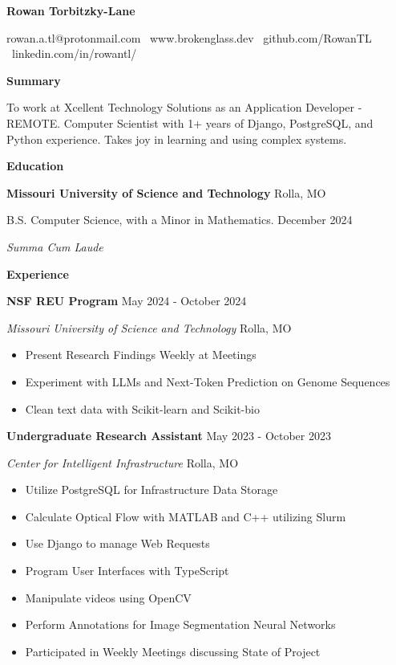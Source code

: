 \documentclass[11pt]{article}
\begin{document}
\begin{center}
    \textbf{\huge Rowan Torbitzky-Lane}\\
    \hrulefill
\end{center}

\begin{center}
    rowan.a.tl@protonmail.com \textbullet \ www.brokenglass.dev \textbullet \ github.com/RowanTL
    \textbullet \ linkedin.com/in/rowantl/
\end{center}


\begin{center}
    \textbf{Summary}
\end{center}

To work at Xcellent Technology Solutions as an Application Developer - REMOTE. Computer Scientist with 1+ years of Django, PostgreSQL, and Python experience. Takes joy in learning and using complex systems.


\begin{center}
    \textbf{Education}
\end{center}
\textbf{Missouri University of Science and Technology} \hfill Rolla, MO

B.S. Computer Science, with a Minor in Mathematics. \hfill December 2024

\textit{Summa Cum Laude}

\begin{center}
    \textbf{Experience}
\end{center}

\textbf{NSF REU Program} \hfill May 2024 - October 2024

\textsl{Missouri University of Science and Technology} \hfill Rolla, MO
\begin{itemize}[noitemsep]
    \item Present Research Findings Weekly at Meetings
    \item Experiment with LLMs and Next-Token Prediction on Genome Sequences
    \item Clean text data with Scikit-learn and Scikit-bio
\end{itemize}

\textbf{Undergraduate Research Assistant} \hfill May 2023 - October 2023

\textsl{Center for Intelligent Infrastructure} \hfill Rolla, MO
\begin{itemize}[noitemsep]
    \item Utilize PostgreSQL for Infrastructure Data Storage
    \item Calculate Optical Flow with MATLAB and C++ utilizing Slurm
    \item Use Django to manage Web Requests
    \item Program User Interfaces with TypeScript
    \item Manipulate videos using OpenCV
    \item Perform Annotations for Image Segmentation Neural Networks
    \item Participated in Weekly Meetings discussing State of Project
\end{itemize}
\end{document}

